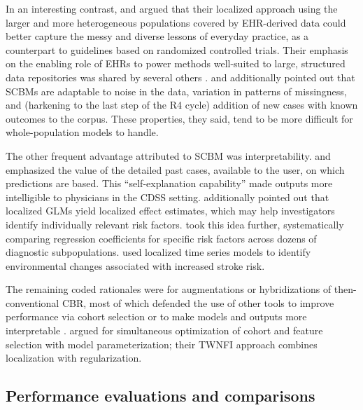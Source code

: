 \documentclass[sn-mathphys,Numbered,pdflatex]{sn-jnl}
\theoremstyle{remark}
\theoremstyle{definition}
\newcommand{\hl}[1]{#1}
\begin{document}
In an interesting contrast, \citet{Tang2021} and \citet{Ng2021} argued
that their localized approach using the larger and more heterogeneous
populations covered by EHR-derived data could better capture the messy
and diverse lessons of everyday practice, as a counterpart to guidelines
based on randomized controlled trials. Their emphasis on the enabling
role of EHRs to power methods well-suited to large, structured data
repositories was shared by several others
\citep{CampilloGimenez2013, Nicolas2014, Verma2015, Lee2017}.
\citet{Verma2015} and \citet{Zhang2018} additionally pointed out that
\hl{SCBM}s are adaptable to noise in the data, variation in patterns of
missingness, and (harkening to the last step of the R4 cycle) addition
of new cases with known outcomes to the corpus. These properties, they
said, tend to be more difficult for whole-population models to handle.

The other frequent advantage attributed to \hl{SCBM} was
interpretability. \citet{Elter2007} and \citet{Nicolas2014} emphasized
the value of the detailed past cases, available to the user, on which
predictions are based. This ``self-explanation capability'' made outputs
more intelligible to physicians in the \hl{CDSS} setting. \citet{Ng2015}
additionally pointed out that localized GLMs yield localized effect
estimates, which may help investigators identify individually relevant
risk factors. \citet{Liu2022} took this idea further, systematically
comparing regression coefficients for specific risk factors across
dozens of diagnostic subpopulations. \citet{Doborjeh2022} used localized
time series models to identify environmental changes associated with
increased stroke risk.

The remaining coded rationales were for augmentations or hybridizations
of then-conventional CBR, most of which defended the use of other tools
to improve performance via cohort selection
\citep{CampilloGimenez2013, Nicolas2014, Vilhena2016} or to make models
and outputs more interpretable \citep{Lopez2011, Wang2019}.
\citet{Liang2015} argued for simultaneous optimization of cohort and
feature selection with model parameterization; their TWNFI approach
combines localization with regularization.

\subsection*{Performance evaluations and
comparisons}\label{performance-evaluations-and-comparisons}
\end{document}
